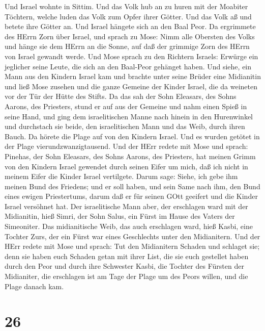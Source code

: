  Und Israel wohnte in Sittim. Und das Volk hub an zu huren
mit der Moabiter Töchtern,  welche luden das Volk zum Opfer
ihrer Götter. Und das Volk aß und betete ihre Götter an. 
Und Israel hängete sich an den Baal Peor. Da ergrimmete des HErrn Zorn
über Israel,  und sprach zu Mose: Nimm alle Obersten des
Volks und hänge sie dem HErrn an die Sonne, auf daß der grimmige Zorn
des HErrn von Israel gewandt werde.  Und Mose sprach zu den
Richtern Israels: Erwürge ein jeglicher seine Leute, die sich an den
Baal-Peor gehänget haben.  Und siehe, ein Mann aus den
Kindern Israel kam und brachte unter seine Brüder eine Midianitin und
ließ Mose zusehen und die ganze Gemeine der Kinder Israel, die da
weineten vor der Tür der Hütte des Stifts.  Da das sah der
Sohn Eleasars, des Sohns Aarons, des Priesters, stund er auf aus der
Gemeine und nahm einen Spieß in seine Hand,  und ging dem
israelitischen Manne nach hinein in den Hurenwinkel und durchstach sie
beide, den israelitischen Mann und das Weib, durch ihren Bauch. Da
hörete die Plage auf von den Kindern Israel.  Und es wurden
getötet in der Plage vierundzwanzigtausend.  Und der HErr
redete mit Mose und sprach:  Pinehas, der Sohn Eleasars,
des Sohns Aarons, des Priesters, hat meinen Grimm von den Kindern Israel
gewendet durch seinen Eifer um mich, daß ich nicht in meinem Eifer die
Kinder Israel vertilgete.  Darum sage: Siehe, ich gebe ihm
meinen Bund des Friedens;  und er soll haben, und sein Same
nach ihm, den Bund eines ewigen Priestertums, darum daß er für seinen
GOtt geeifert und die Kinder Israel versöhnet hat.  Der
israelitische Mann aber, der erschlagen ward mit der Midianitin, hieß
Simri, der Sohn Salus, ein Fürst im Hause des Vaters der Simeoniter.
 Das midianitische Weib, das auch erschlagen ward, hieß
Kasbi, eine Tochter Zurs, der ein Fürst war eines Geschlechts unter den
Midianitern.  Und der HErr redete mit Mose und sprach:
 Tut den Midianitern Schaden und schlaget sie;
 denn sie haben euch Schaden getan mit ihrer List, die sie
euch gestellet haben durch den Peor und durch ihre Schwester Kasbi, die
Tochter des Fürsten der Midianiter, die erschlagen ist am Tage der Plage
um des Peors willen, und die Plage danach kam.

\hypertarget{section-25}{%
\section{26}\label{section-25}}

